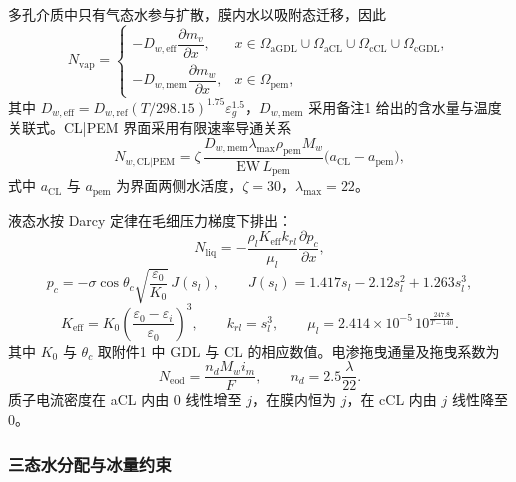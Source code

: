 \documentclass{gmcmthesis}
\begin{document}
多孔介质中只有气态水参与扩散，膜内水以吸附态迁移，因此
\begin{equation}
  N_{\mathrm{vap}}=
  \begin{cases}
    -D_{w,\mathrm{eff}}\dfrac{\partial m_v}{\partial x}, & x\in\Omega_{\mathrm{aGDL}}\cup\Omega_{\mathrm{aCL}}\cup\Omega_{\mathrm{cCL}}\cup\Omega_{\mathrm{cGDL}},\\[2ex]
    -D_{w,\mathrm{mem}}\dfrac{\partial m_w}{\partial x}, & x\in\Omega_{\mathrm{pem}},
  \end{cases}
  \label{eq:nvap}
\end{equation}
其中 $D_{w,\mathrm{eff}}=D_{w,\mathrm{ref}}(T/298.15)^{1.75}\varepsilon_g^{1.5}$，$D_{w,\mathrm{mem}}$ 采用备注1 给出的含水量与温度关联式。CL|PEM 界面采用有限速率导通关系
\begin{equation}
  N_{w,\mathrm{CL|PEM}}
  =\zeta\,\frac{D_{w,\mathrm{mem}}\lambda_{\max}\rho_{\mathrm{pem}}M_w}{\mathrm{EW}\,L_{\mathrm{pem}}}
    \bigl(a_{\mathrm{CL}}-a_{\mathrm{pem}}\bigr),
  \label{eq:interface}
\end{equation}
式中 $a_{\mathrm{CL}}$ 与 $a_{\mathrm{pem}}$ 为界面两侧水活度，$\zeta=30$，$\lambda_{\max}=22$。

液态水按 Darcy 定律在毛细压力梯度下排出：
\begin{equation}
  N_{\mathrm{liq}}=-\frac{\rho_l K_{\mathrm{eff}}k_{rl}}{\mu_l}\frac{\partial p_c}{\partial x},
  \label{eq:nliq}
\end{equation}
\begin{equation}
  p_c=-\sigma\cos\theta_c\sqrt{\frac{\varepsilon_0}{K_0}}\,J(s_l),
  \qquad
  J(s_l)=1.417s_l-2.12s_l^2+1.263s_l^3,
  \label{eq:pc}
\end{equation}
\begin{equation}
  K_{\mathrm{eff}}=K_0\left(\frac{\varepsilon_0-\varepsilon_i}{\varepsilon_0}\right)^{3},
  \qquad
  k_{rl}=s_l^{3},
  \qquad
  \mu_l=2.414\times10^{-5}\,10^{\frac{247.8}{T-140}}.
  \label{eq:kr}
\end{equation}
其中 $K_0$ 与 $\theta_c$ 取附件1 中 GDL 与 CL 的相应数值。电渗拖曳通量及拖曳系数为
\begin{equation}
  N_{\mathrm{eod}}=\frac{n_d M_w i_m}{F},
  \qquad
  n_d=2.5\frac{\lambda}{22}.
  \label{eq:neod}
\end{equation}
质子电流密度在 aCL 内由 $0$ 线性增至 $j$，在膜内恒为 $j$，在 cCL 内由 $j$ 线性降至 $0$。

\subsubsection{三态水分配与冰量约束}
\end{document}
